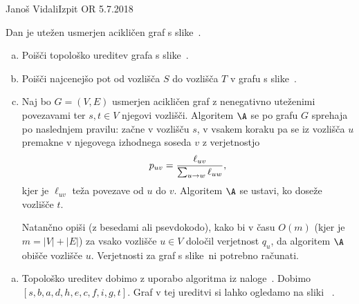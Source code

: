 \begin{naloga}{Janoš Vidali}{Izpit OR 5.7.2018}
\begin{vprasanje}
Dan je utežen usmerjen acikličen graf s slike~\fig.

\begin{enumerate}[(a)]
\item Poišči topološko ureditev grafa s slike~\fig.

\item Poišči najcenejšo pot od vozlišča $S$ do vozlišča $T$
v grafu s slike~\fig.

\item Naj bo $G = (V, E)$ usmerjen acikličen graf
z nenegativno uteženimi povezavami
ter $s, t \in V$ njegovi vozlišči.
Algoritem $\A$ se po grafu $G$ sprehaja po naslednjem pravilu:
začne v vozlišču $s$,
v vsakem koraku pa se iz vozlišča $u$ premakne
v njegovega izhodnega soseda $v$ z verjetnostjo
$$
p_{uv} = {\ell_{uv} \over \sum_{u \to w} \ell_{uw}} ,
$$
kjer je $\ell_{uv}$ teža povezave od $u$ do $v$.
Algoritem $\A$ se ustavi, ko doseže vozlišče $t$.

Natančno opiši (z besedami ali psevdokodo),
kako bi v času $O(m)$ (kjer je $m = |V| + |E|$)
za vsako vozlišče $u \in V$ določil verjetnost $q_u$,
da algoritem $\A$ obišče vozlišče $u$.
Verjetnosti za graf s slike~\fig ni potrebno računati.
\end{enumerate}

\begin{slika}
\pgfslika
{}
\end{slika}
\end{vprasanje}
\begin{odgovor}
\begin{enumerate}[(a)]
\item Topološko ureditev dobimo z uporabo algoritma iz naloge~\nal[topo].
Dobimo $[s, b, a, d, h, e, c, f, i, g, t]$. 
Graf v tej ureditvi si lahko ogledamo na sliki ~.
\begin{slika}
\end{slika}


\end{enumerate}
\end{odgovor}
\end{naloga}
